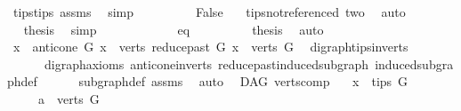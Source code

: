 \begin{isabellebody}
\ tips{\isacharunderscore}{\kern0pt}tips\ assms{\isacharparenleft}{\kern0pt}{}{\isacharparenright}{\kern0pt}\ \isamarkupfalse%
\ simp\isanewline
\ \ \ \ \ \ \isamarkupfalse%
\ \isamarkupfalse%
\ {\isachardoublequoteopen}False{\isachardoublequoteclose}\ \isamarkupfalse%
\ \ tips{\isacharunderscore}{\kern0pt}not{\isacharunderscore}{\kern0pt}referenced\ two\ \isamarkupfalse%
\ auto\isanewline
\ \ \ \ \ \ \isamarkupfalse%
\ \isamarkupfalse%
\ {\isacharquery}{\kern0pt}thesis\ \isamarkupfalse%
\ simp\isanewline
\ \ \ \ \isamarkupfalse%
\isanewline
\ \ \ \ \ \ \isamarkupfalse%
\ eq\isanewline
\ \ \ \ \ \ \isamarkupfalse%
\ \isamarkupfalse%
\ {\isacharquery}{\kern0pt}thesis\ \isamarkupfalse%
\ auto\isanewline
\ \ \ \ \isamarkupfalse%
\isanewline
\ \ \isamarkupfalse%
\isanewline
{}\isamarkupfalse%
\ \isanewline
\ \ \isamarkupfalse%
\ {\isachardoublequoteopen}{\isacharbraceleft}{\kern0pt}x{\isacharbraceright}{\kern0pt}\ {\isasymunion}\ anticone\ G\ x\ {\isasymunion}\ verts\ {\isacharparenleft}{\kern0pt}reduce{\isacharunderscore}{\kern0pt}past\ G\ x{\isacharparenright}{\kern0pt}\ {\isasymsubseteq}\ verts\ G{\isachardoublequoteclose}\ \isamarkupfalse%
\ digraph{\isachardot}{\kern0pt}tips{\isacharunderscore}{\kern0pt}in{\isacharunderscore}{\kern0pt}verts\ \isanewline
\ \ \ \ \ \ digraph{\isacharunderscore}{\kern0pt}axioms\ anticone{\isacharunderscore}{\kern0pt}in{\isacharunderscore}{\kern0pt}verts\ reduce{\isacharunderscore}{\kern0pt}past{\isacharunderscore}{\kern0pt}induced{\isacharunderscore}{\kern0pt}subgraph\ induced{\isacharunderscore}{\kern0pt}subgraph{\isacharunderscore}{\kern0pt}def\isanewline
\ \ \ \ \ \ subgraph{\isacharunderscore}{\kern0pt}def\ assms\ \isamarkupfalse%
\ auto\isanewline
{}\isamarkupfalse%
%
\endisatagproof
{\isafoldproof}%
%
\isadelimproof
\isanewline
%
\endisadelimproof
\isanewline
\isanewline
{}\isamarkupfalse%
\ {\isacharparenleft}{\kern0pt}\ DAG{\isacharparenright}{\kern0pt}\ verts{\isacharunderscore}{\kern0pt}comp{}{\isacharcolon}{\kern0pt}\isanewline
\ \ \ {\isachardoublequoteopen}x\ {\isasymin}\ tips\ G{\isachardoublequoteclose}\isanewline
\ \ \ \ \ {\isachardoublequoteopen}a\ {\isasymin}\ verts\ G{\isachardoublequoteclose}\isanewline

\end{isabellebody}
